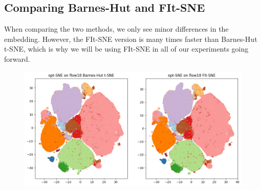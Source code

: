 \subsection{Comparing Barnes-Hut and FIt-SNE}
When comparing the two methods, we only see minor differences in the embedding. 
However, the FIt-SNE version is many times faster than Barnes-Hut t-SNE, which is why we will be using FIt-SNE in all of our experiments going forward. 
\begin{figure}[h]
    \begin{center}
        \includegraphics[width=\linewidth]{figures/BH_vs_FFT.png}
    \end{center}
\end{figure}
